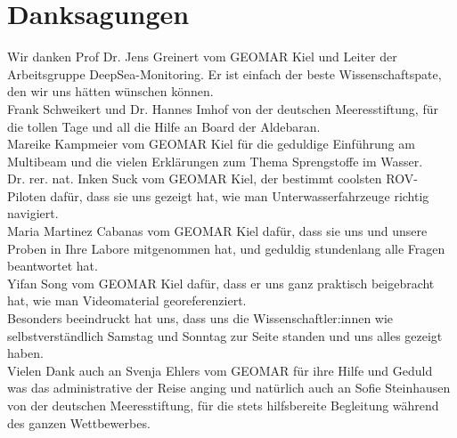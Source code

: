  

\chapter[Danksagungen]{Danksagungen}
Wir danken Prof Dr. Jens Greinert vom GEOMAR Kiel und Leiter der Arbeitsgruppe DeepSea-Monitoring. Er ist einfach der beste Wissenschaftspate, den wir uns hätten wünschen können.\\



Frank Schweikert und Dr. Hannes Imhof von der deutschen Meeresstiftung, für die tollen Tage und all die Hilfe an Board der Aldebaran. \\



Mareike Kampmeier vom GEOMAR Kiel für die geduldige Einführung am Multibeam und die vielen Erklärungen zum Thema Sprengstoffe im Wasser. \\



Dr. rer. nat. Inken Suck vom GEOMAR Kiel, der bestimmt coolsten ROV-Piloten dafür, dass sie uns gezeigt hat, wie man Unterwasserfahrzeuge richtig navigiert. \\



Maria Martinez Cabanas vom GEOMAR Kiel dafür, dass sie uns und unsere Proben in Ihre Labore mitgenommen hat, und geduldig stundenlang alle Fragen beantwortet hat.\\



Yifan Song vom GEOMAR Kiel dafür, dass er uns ganz praktisch beigebracht hat, wie man Videomaterial georeferenziert.\\



Besonders beeindruckt hat uns, dass uns die Wissenschaftler:innen wie selbstverständlich Samstag und Sonntag zur Seite standen und uns alles gezeigt haben.\\



Vielen Dank auch an Svenja Ehlers vom GEOMAR für ihre Hilfe und Geduld was das administrative der Reise anging und natürlich auch an Sofie Steinhausen von der deutschen Meeresstiftung, für die stets hilfsbereite Begleitung während des ganzen Wettbewerbes.\\



